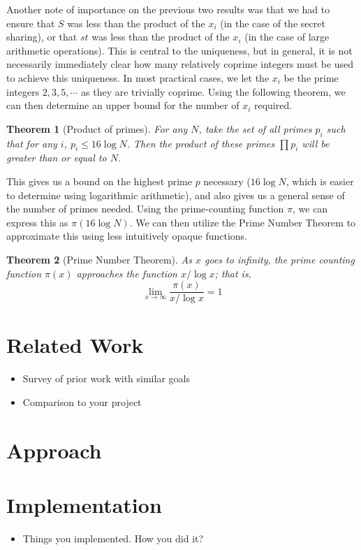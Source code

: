 \documentclass[pageno]{jpaper}
\newtheorem{theorem}{Theorem}[section]
\begin{document}
Another note of importance on the previous two results was that we had to ensure that $S$ was less than the product of the $x_i$ (in the case of the secret sharing), or that $st$ was less than the product of the $x_i$ (in the case of large arithmetic operations).
This is central to the uniqueness, but in general, it is not necessarily immediately clear how many relatively coprime integers must be used to achieve this uniqueness.
In most practical cases, we let the $x_i$ be the prime integers $2, 3, 5, \cdots$ as they are trivially coprime.
Using the following theorem, we can then determine an upper bound for the number of $x_i$ required.
\begin{theorem}[Product of primes]
  For any $N$, take the set of all primes $p_i$ such that for any $i$, $p_i \leq 16\log N$.
  Then the product of these primes $\prod p_i$ will be greater than or equal to $N$.
\end{theorem}
This gives us a bound on the highest prime $p$ necessary ($16\log N$, which is easier to determine using logarithmic arithmetic), and also gives us a general sense of the number of primes needed.
Using the prime-counting function $\pi$, we can express this as $\pi(16\log N)$.
We can then utilize the Prime Number Theorem to approximate this using less intuitively opaque functions.
\begin{theorem}[Prime Number Theorem]
  As $x$ goes to infinity, the prime counting function $\pi(x)$ approaches the function $x/\log x$; that is,
  \[\lim_{x\to\infty} \frac{\pi(x)}{x/\log x} = 1\]
\end{theorem}


\section{Related Work}
\begin{itemize}
\item Survey of prior work with similar goals 
\item Comparison to your project 
\end{itemize}


\section{Approach}

\section{Implementation}
\begin{itemize}
\item Things you implemented.  How you did it? 
\end{itemize}
\end{document}
